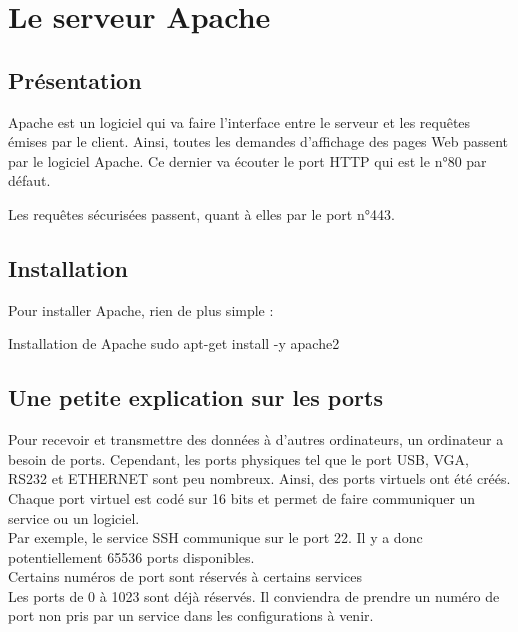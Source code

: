 


\chapter{Le serveur Apache}



\section{Présentation} \label{apache}

Apache est un logiciel qui va faire l’interface entre le serveur et les requêtes émises par le client. Ainsi, toutes les demandes d’affichage des pages Web passent par le logiciel Apache.
Ce dernier va écouter le port HTTP qui est le n°80 par défaut. \\


Les requêtes sécurisées passent, quant à elles par le port n°443. \\

\section{Installation}
Pour installer Apache, rien de plus simple :
\begin{Bash}{Installation de Apache}
sudo apt-get install -y apache2
\end{Bash}


\section{Une petite explication sur les ports}

Pour recevoir et transmettre des données à d’autres ordinateurs, un ordinateur a besoin de ports. Cependant, les ports physiques tel que le port USB, VGA, RS232 et ETHERNET sont peu nombreux. Ainsi, des ports virtuels ont été créés. \\

Chaque port virtuel est codé sur 16 bits et permet de faire communiquer un service ou un logiciel.\\
Par exemple, le service SSH communique sur le port 22. 
Il y a donc potentiellement 65536 ports disponibles. \\
Certains numéros de port sont réservés à certains services \\
Les ports de 0 à 1023 sont déjà réservés. Il conviendra de prendre un numéro de port non pris par un service dans les configurations à venir. \\

